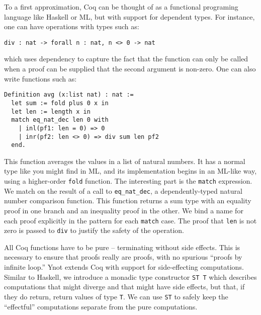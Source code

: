 \documentclass[preprint,nocopyrightspace]{sigplanconf}
\newcommand{\cd}[1]{\texttt{#1}}
\begin{document}
To a first approximation, Coq can be thought of as a functional
programing language like Haskell or ML, but with support for dependent
types.  For instance, one can have operations with types such as:
\begin{verbatim}
div : nat -> forall n : nat, n <> 0 -> nat
\end{verbatim}
which uses dependency to capture the fact that the function can only
be called when a proof can be supplied that the second argument is
non-zero.  One can also write functions such as:
\begin{verbatim}
Definition avg (x:list nat) : nat :=
  let sum := fold plus 0 x in
  let len := length x in
  match eq_nat_dec len 0 with
    | inl(pf1: len = 0) => 0
    | inr(pf2: len <> 0) => div sum len pf2
  end.
\end{verbatim}

This function averages the values in a list of natural numbers.  It has a normal type like you might find in ML, and its implementation begins in an ML-like way, using a higher-order \cd{fold} function.  The interesting part is the \cd{match} expression.  We match on the result of a call to \cd{eq\_nat\_dec}, a dependently-typed natural number comparison function.  This function returns a sum type with an equality proof in one branch and an inequality proof in the other. We bind a name for each proof explicitly in the pattern for each \cd{match} case.  The proof that \cd{len} is not zero is passed to \cd{div} to justify the safety of the operation.

All Coq functions have to be pure -- terminating without side effects.  This is necessary to ensure that proofs really are proofs, with no spurious ``proofs by infinite loop.''  Ynot extends Coq with support for side-effecting computations.  Similar to Haskell, we introduce a monadic type constructor \cd{ST T} which describes computations that might diverge and that might have side effects, but that, if they do return, return values of type \cd{T}.  We can use \cd{ST} to safely keep the ``effectful'' computations separate from the pure computations.
\end{document}

